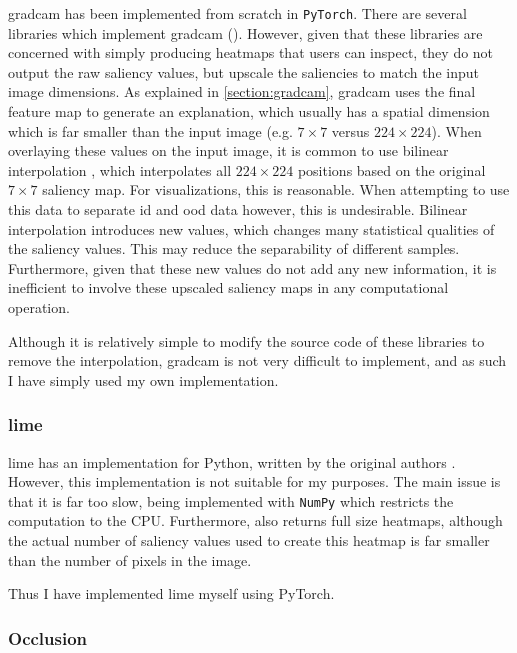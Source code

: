\documentclass[UKenglish]{uiomasterthesis} %
\theoremstyle{definition}
\begin{document}
\ac{gradcam} has been implemented from scratch in \texttt{PyTorch}. There are several libraries which implement \ac{gradcam} (\cite{jacobgilpytorchcam, captum}). However, given that these libraries are concerned with simply producing heatmaps that users can inspect, they do not output the raw saliency values, but upscale the saliencies to match the input image dimensions. As explained in \ref{section:gradcam}, \ac{gradcam} uses the final feature map to generate an explanation, which usually has a spatial dimension which is far smaller than the input image (e.g. $7 \times 7$ versus $224 \times 224$). When overlaying these values on the input image, it is common to use bilinear interpolation \cite{jacobgilpytorchcam}, which interpolates all $224 \times 224$ positions based on the original $7 \times 7$ saliency map. For visualizations, this is reasonable. When attempting to use this data to separate \ac{id} and \ac{ood} data however, this is undesirable. Bilinear interpolation introduces new values, which changes many statistical qualities of the saliency values. This may reduce the separability of different samples. Furthermore, given that these new values do not add any new information, it is inefficient to involve these upscaled saliency maps in any computational operation.

Although it is relatively simple to modify the source code of these libraries to remove the interpolation, \ac{gradcam} is not very difficult to implement, and as such I have simply used my own implementation.

\subsubsection{\ac{lime}}

\ac{lime} has an implementation for Python, written by the original authors \cite{lime}. However, this implementation is not suitable for my purposes. The main issue is that it is far too slow, being implemented with \texttt{NumPy} which restricts the computation to the CPU. Furthermore, \cite{lime} also returns full size heatmaps, although the actual number of saliency values used to create this heatmap is far smaller than the number of pixels in the image.

Thus I have implemented \ac{lime} myself using PyTorch.

\subsubsection{Occlusion}
\end{document}

